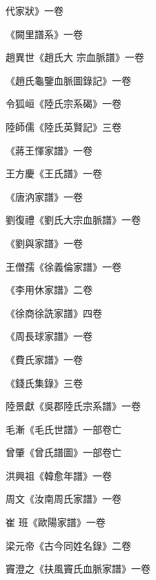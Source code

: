 \begin{pinyinscope}
 代家狀》一卷



 《闕里譜系》一卷



 趙異世《趙氏大
 宗血脈譜》一卷



 《趙氏龜鑒血脈圖錄記》一卷



 令狐峘《陸氏宗系碣》一卷



 陸師儒《陸氏英賢記》三卷



 《蔣王惲家譜》一卷



 王方慶《王氏譜》一卷



 《唐汭家譜》一卷



 劉復禮《劉氏大宗血脈譜》一卷



 《劉與家譜》一卷



 王僧孺《徐義倫家譜》一卷



 《李用休家譜》二卷



 《徐商徐詵家譜》四卷



 《周長球家譜》一卷



 《費氏家譜》一卷



 《錢氏集錄》三卷



 陸景獻《吳郡陸氏宗系譜》一卷



 毛漸《毛氏世譜》一部卷亡



 曾肇《曾氏譜圖》一部卷亡



 洪興祖《韓愈年譜》一卷



 周文《汝南周氏家譜》一卷



 崔
 班《歐陽家譜》一卷



 梁元帝《古今同姓名錄》二卷



 竇澄之《扶風竇氏血脈家譜》一卷




\end{pinyinscope}
